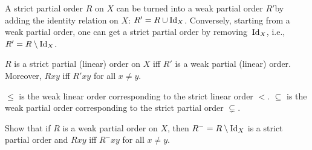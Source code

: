 \documentclass[../../include/open-logic-section]{subfiles}
\begin{document}
A strict partial order $R$ on $X$ can be turned into a weak partial
order $R'$by adding the identity relation on $X$: $R' = R \cup \mathord{\mathrm{Id}_{X}}$.
Conversely, starting from a weak partial order, one can get a strict
partial order by removing~$\mathord{\mathrm{Id}_{X}}$, i.e., $R' = R \setminus \mathord{\mathrm{Id}_{X}}$.

\begin{prop}
$R$ is a strict partial (linear) order on $X$ iff $R'$ is a weak
  partial (linear) order. Moreover, $Rxy$ iff $R'xy$ for all $x \neq
  y$.
\end{prop}

\begin{ex}
$\le$ is the weak linear order corresponding to the strict linear
  order $<$. $\subseteq$ is the weak partial order corresponding to the
  strict partial order $\subsetneq$.
\end{ex}

\begin{prob}
Show that if $R$ is a weak partial order on $X$, then
$R^{-}=R \setminus \mathord{\mathrm{Id}_{X}}$ is a strict partial order and $Rxy$ iff
$R^{-}xy$ for all $x \neq y$.
\end{prob}
\end{document}

